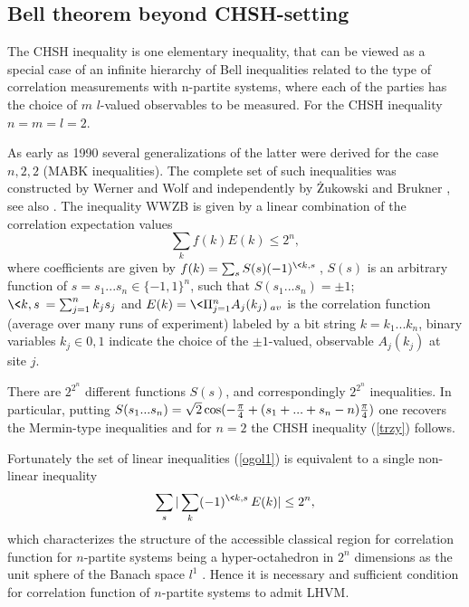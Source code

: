 \documentclass[twocolumn,aps,rmp]{revtex4}
\begin{document}
\subsection {Bell theorem beyond CHSH-setting}

The CHSH inequality is one elementary inequality, that can be viewed
as a special case of an infinite hierarchy of Bell inequalities
related to the type of correlation measurements with n-partite
systems, where each of the parties has the choice of $m$ $l$-valued
observables to be measured. For the CHSH inequality $n=m=l=2$.

As early as 1990 several generalizations of the latter were derived
for the case $n,2,2$ (MABK inequalities). The complete set of
such inequalities was constructed by Werner and Wolf \cite {Wolf} and
independently by \.Zukowski and Brukner \cite{ZB}, see also
\cite{WeinfurterZ_4fotent2001}. The inequality WWZB is given by a
linear combination of the correlation expectation values
\begin{equation}
  \sum_k f(k)E(k)\leq 2^n, \label{ogol1}
\end{equation}
where coefficients are given by $f(k)=\sum_{s} S(s)(-1)^{\<k,s\>}$,
$S(s)$ is an arbitrary function of $s=s_1...s_n\in \{-1,1\}^n$, such
that $S(s_1...s_n)=\pm 1$; $\<k,s\> = \sum^n_{j=1}{k_js_j}$ and
$E(k)=\<\Pi ^n_{j=1}A_j(k_j)\>_{av}$ is the correlation function
(average over many runs of experiment) labeled by a bit string
$k=k_1...k_n$, binary variables $k_j\in {0,1}$ indicate the choice of
the $\pm 1$-valued, observable $A_j(k_j)$ at site $j$.

There are $2^{2^n}$ different functions $S(s)$, and correspondingly
$2^{2^n}$ inequalities. In particular, putting $S(s_1...s_n)= \sqrt2 \cos
(-{\pi  \over4}+(s_1+...+s_n-n){\pi  \over4})$ one recovers the
Mermin-type inequalities and for $n=2$ the CHSH inequality
(\ref{trzy}) follows.

Fortunately the set of linear inequalities (\ref{ogol1}) is equivalent
to a single non-linear inequality
\begin{equation}
\sum_s|\sum_k(-1)^{\<k,s\>}E(k)|\leq 2^n, \label{ogol2}
\end{equation}
which characterizes the structure of the accessible classical region
for correlation function for $n$-partite systems being a
hyper-octahedron in $2^n$ dimensions as the unit sphere of the Banach
space $l^1$ \cite {Wolf}. Hence it is necessary and sufficient
condition for correlation function of $n$-partite systems to admit
LHVM.
\end{document}
